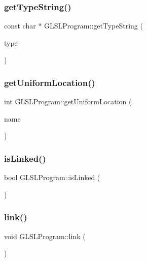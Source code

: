 \subsubsection{\texorpdfstring{getTypeString()}{getTypeString()}}
{\footnotesize\ttfamily const char $\ast$ G\+L\+S\+L\+Program\+::get\+Type\+String (\begin{DoxyParamCaption}\item[{G\+Lenum}]{type }\end{DoxyParamCaption})}

\mbox{\label{class_g_l_s_l_program_a38a5d967d3f7ee46b6a8031bc83495dc}} 
\subsubsection{\texorpdfstring{getUniformLocation()}{getUniformLocation()}}
{\footnotesize\ttfamily int G\+L\+S\+L\+Program\+::get\+Uniform\+Location (\begin{DoxyParamCaption}\item[{const char $\ast$}]{name }\end{DoxyParamCaption})\hspace{0.3cm}{\ttfamily [private]}}

\mbox{\label{class_g_l_s_l_program_ad0d1efa38db415e35d9a329a93828815}} 
\subsubsection{\texorpdfstring{isLinked()}{isLinked()}}
{\footnotesize\ttfamily bool G\+L\+S\+L\+Program\+::is\+Linked (\begin{DoxyParamCaption}{ }\end{DoxyParamCaption})}

\mbox{\label{class_g_l_s_l_program_adba8352af3d733cd6644f07e8512c38f}} 
\subsubsection{\texorpdfstring{link()}{link()}}
{\footnotesize\ttfamily void G\+L\+S\+L\+Program\+::link (\begin{DoxyParamCaption}{ }\end{DoxyParamCaption})}

